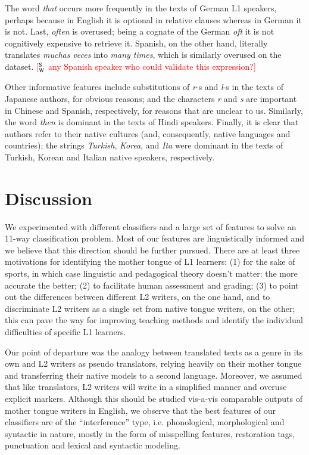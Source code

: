 \documentclass[11pt,letterpaper]{article}
\newcommand{\ensuretext}[1]{#1}
\newcommand{\swmarker}{\ensuretext{\textcolor{red}{\ensuremath{^{\textsc{S}}_{\textsc{W}}}}}}
\newcommand{\arkcomment}[3]{\ensuretext{\textcolor{#3}{[#1 #2]}}}
\newcommand{\sw}[1]{\arkcomment{\swmarker}{#1}{red}}
\newcommand{\textnl}{\textsl}
\begin{document}
The word \textnl{that} occurs more frequently in the texts of German
L1 speakers, perhaps because in English it is optional in relative
clauses whereas in German it is not.  Last, \textnl{often} is
overused; being a cognate of the German \textnl{oft} it is not
cognitively expensive to retrieve it. Spanish, on the other hand,
literally translates \textnl{muchas veces} into \textnl{many times},
which is similarly overused on the dataset. \sw{any Spanish speaker
  who could validate this expression?}

Other informative features include substitutions of \textnl{r}-s and
\textnl{l}-s in the texts of Japanese authors, for obvious reasons;
and the characters \textnl{r} and \textnl{s} are important in Chinese
and Spanish, respectively, for reasons that are unclear to
us. Similarly, the word \textnl{then} is dominant in the texts of
Hindi speakers. Finally, it is clear that authors refer to their
native cultures (and, consequently, native languages and countries);
the strings \textnl{Turkish}, \textnl{Korea}, and \textnl{Ita} were
dominant in the texts of Turkish, Korean and Italian native speakers,
respectively.

\section{Discussion}
\label{sec:discussion}

We experimented with different classifiers and a large set of features to solve an 11-way classification problem. Most of our features are linguistically informed and we believe that this direction should be further pursued. There are at least three motivations for identifying the mother tongue of L1 learners: (1) for the sake of sports, in which case linguistic and pedagogical theory doesn't matter: the more accurate the better; (2) to facilitate human assessment and grading; (3) to point out the differences between different L2 writers, on the one hand, and to discriminate L2 writers as a single set from native tongue writers, on the other; this can pave the way for improving teaching methods and identify the individual difficulties of specific L1 learners.

Our point of departure was the analogy between translated texts as a genre in its own and L2 writers as pseudo translators, relying heavily on their mother tongue and transferring their native models to a second language. Moreover, we assumed that like translators, L2 writers will write in a simplified manner and overuse explicit markers. Although this should be studied vis-a-vis comparable outputs of mother tongue writers in English, we observe that the best features of our classifiers are of the ``interference'' type, i.e. phonological, morphological and syntactic in nature, mostly in the form of misspelling features, restoration tags, punctuation and lexical and syntactic modeling.
\end{document}
